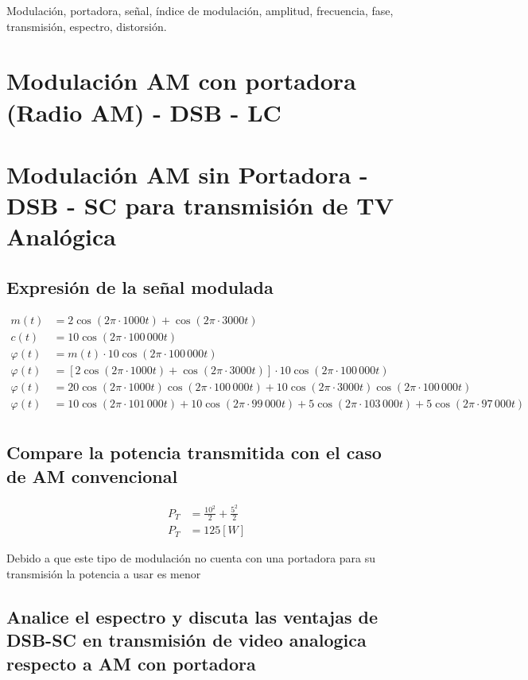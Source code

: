 \documentclass[conference]{IEEEtran}
\begin{document}
	\begin{IEEEkeywords}
		Modulación, portadora, señal, índice de modulación, amplitud, frecuencia, fase, transmisión, espectro, distorsión.
	\end{IEEEkeywords}
	\section{Modulación AM con portadora (Radio AM) - DSB - LC}
	
	\section{Modulación AM sin Portadora - DSB - SC para transmisión de TV Analógica}
	\subsection{Expresión de la señal modulada}
	\begin{align*}
		m(t) &= 2\cos(2\pi \cdot 1000t) + \cos(2\pi \cdot 3000t) \\
		c(t) &= 10\cos(2\pi \cdot 100\,000t) \\
		\varphi(t) &= m(t) \cdot 10 \cos(2\pi \cdot 100\,000t) \\
		\varphi(t) &= \left[2\cos(2\pi \cdot 1000t) + \cos(2\pi \cdot 3000t)\right] \cdot 10 \cos(2\pi \cdot 100\,000t) \\
		\varphi(t) &= 20 \cos(2\pi \cdot 1000t) \cos(2\pi \cdot 100\,000t) + 10 \cos(2\pi \cdot 3000t) \cos(2\pi \cdot 100\,000t) \\
		\varphi(t) &= 10 \cos(2\pi \cdot 101\,000t) + 10 \cos(2\pi \cdot 99\,000t) + 5 \cos(2\pi \cdot 103\,000t) + 5 \cos(2\pi \cdot 97\,000t) \\
	\end{align*}
	\subsection{Compare la potencia transmitida con el caso de AM convencional}
	\begin{align*}
		P_T &= \frac{10^2}{2} + \frac{5^2}{2} \\
		P_T &= 125 [W]
	\end{align*}
	
	Debido a que este tipo de modulación no cuenta con una portadora para su transmisión la potencia a usar es menor
	\subsection{Analice el espectro y discuta las ventajas de DSB-SC en transmisión de video analogica respecto a AM con portadora}
	
\end{document}
